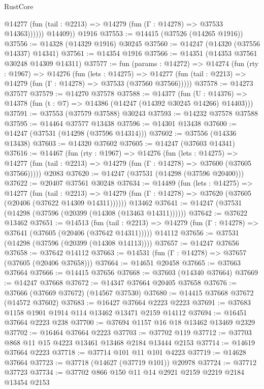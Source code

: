 \begin{lexlean}{RustCore}
\begin{coremodule}
              @14277 (fun (tail : @2213) => @14279 (fun (Γ : @14278) => @37533 @14363))))))
        @14409))
    @1916
@37553 := @14415 (@37526 (@14265 @1916))
@37556 := @14328 (@14329 @1916) @30245
@37560 := @14247 (@14320 (@37556 @14337) @14341)
@37561 := @14354 @1916
@37566 := @14351 (@14353 @37561 @30248 @14309 @14311)
@37577 := fun (params : @14272) =>
  @14274
    (fun (rty : @1967) =>
    @14276
      (fun (lets : @14275) =>
      @14277 (fun (tail : @2213) => @14279 (fun (Γ : @14278) => @37533 (@37560 @37566)))))
@37578 := @14273 @37577
@37579 := @14270 @37578
@37588 := @14377
    (fun (U : @14376) => @14378 (fun (t : @7) => @14386 (@14247 (@14392 @30245 @14266) @14403)))
@37591 := @37553 (@37579 @37588) @30243
@37593 := @14232 @37578 @37588
@37595 := @14464 @37577 @13438
@37596 := @14301 @13438
@37600 := @14247 (@37531 (@14298 (@37596 @14314)))
@37602 := @37556 (@14336 @13438)
@37603 := @14320 @37602
@37605 := @14247 (@37603 @14341)
@37616 := @14467
    (fun (rty : @1967) =>
    @14276
      (fun (lets : @14275) =>
      @14277 (fun (tail : @2213) => @14279 (fun (Γ : @14278) => @37600 (@37605 @37566)))))
    @2083
@37620 := @14247 (@37531 (@14298 (@37596 @20400)))
@37622 := @20407 @37561 @30248
@37634 := @14489
    (fun (lets : @14275) =>
    @14277
      (fun (tail : @2213) =>
      @14279 (fun (Γ : @14278) => @37620 (@37605 (@20406 (@37622 @14309 @14311))))))
    @13462
@37641 := @14247 (@37531 (@14298 (@37596 (@20399 (@14308 (@13463 @14311))))))
@37642 := @37622 @13462
@37651 := @14513
    (fun (tail : @2213) => @14279 (fun (Γ : @14278) => @37641 (@37605 (@20406 (@37642 @14311)))))
    @14112
@37656 := @37531 (@14298 (@37596 (@20399 (@14308 @14113))))
@37657 := @14247 @37656
@37658 := @37642 @14112
@37663 := @14531 (fun (Γ : @14278) => @37657 (@37605 (@20406 @37658)))
@37664 := @14651 @20458
@37665 := @37663 @37664
@37666 := @14415 @37656
@37668 := @37603 (@14340 @37664)
@37669 := @14247 @37668
@37672 := @14347 @37664 @20405 @37658
@37676 := @37666 (@37669 @37672) (@14567 @37530)
@37680 := @14415 @37668 @37672 (@14572 @37602)
@37683 := @16427 @37664 @2223 @2223
@37691 := @37683 @1158 @1901 @1914 @114 @13462 @13471 @2159 @14112
@37694 := @16451 @37664 @2223 @238
@37700 := @37694 @1157 @16 @18 @13462 @13469 @2329
@37702 := @16464 @37664 @2223
@37703 := @37702 @119
@37712 := @37703 @868 @11 @15 @4223 @13461 @13468 @2184 @13444 @2153
@37714 := @14619 @37664 @2223
@37718 := @37714 @101 @11 @101 @4223
@37719 := @14628 @37664
@37723 := @37718 (@14627 (@37719 @101)) @20978
@37724 := @37712 @37723
@37734 := @37702 @866 @150 @11 @14 @2921 @2159 @2219 @2184 @13454 @2153

\end{coremodule}
\end{lexlean}
